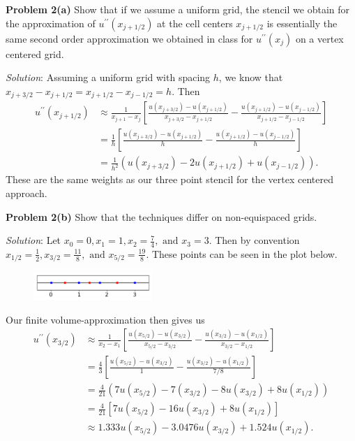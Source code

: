 \documentclass[12pt]{article}
\newcommand{\problem}[1]{\hspace{-4 ex} \large \textbf{Problem #1} }
\newcommand{\solution}{\textit{Solution}:\bigbreak}
\begin{document}
\problem{2(a)} Show that if we assume a uniform grid, the stencil we obtain for the approximation of $u^{\prime\prime}(x_{j+1/2})$ at the cell centers $x_{j+1/2}$ is essentially the same second order approximation we obtained in class for $u^{\prime\prime}(x_j)$ on a vertex centered grid. \bigbreak

\solution
Assuming a uniform grid with spacing $h$, we know that $x_{j+3/2}-x_{j+1/2} = x_{j+1/2}-x_{j-1/2} = h$. Then
\begin{align*}
	u^{\prime\prime}(x_{j+1/2}) &\approx \frac{1}{x_{j+1} - x_j} \left[ \frac{u(x_{j+3/2}) - u(x_{j+1/2})}{x_{j+3/2} - x_{j+1/2}} - \frac{u(x_{j+1/2}) - u(x_{j-1/2})}{x_{j+1/2} - x_{j-1/2}} \right] \\
	 &= \frac{1}{h} \left[ \frac{u(x_{j+3/2}) - u(x_{j+1/2})}{h} - \frac{u(x_{j+1/2}) - u(x_{j-1/2})}{h} \right] \\
	 &= \frac{1}{h^2} \left( u(x_{j+3/2}) - 2u(x_{j+1/2}) + u(x_{j-1/2}) \right) \text{.}
\end{align*}
These are the same weights as our three point stencil for the vertex centered approach.
\bigbreak


\problem{2(b)} Show that the techniques differ on non-equispaced grids. 

\solution
Let $x_0 = 0, x_1 = 1, x_2 = \frac{7}{4}, \text{ and } x_3 = 3$.  Then by convention $x_{1/2} = \frac{1}{2}, x_{3/2} = \frac{11}{8}, \text{ and } x_{5/2} = \frac{19}{8}$. These points can be seen in the plot below.
\begin{figure}[H]
	\includegraphics[width=0.4\textwidth]{unequal_points}
	\centering
\end{figure}

Our finite volume-approximation then gives us
\begin{align*}
	u^{\prime\prime}(x_{3/2}) &\approx \frac{1}{x_{2} - x_1} \left[ \frac{u(x_{5/2}) - u(x_{3/2})}{x_{5/2} - x_{3/2}} - \frac{u(x_{3/2}) - u(x_{1/2})}{x_{3/2} - x_{1/2}} \right] \\
	&= \frac{4}{3} \left[ \frac{u(x_{5/2}) - u(x_{3/2})}{1} - \frac{u(x_{3/2}) - u(x_{1/2})}{7/8} \right] \\
	&= \frac{4}{21} \left( 7u(x_{5/2}) - 7(x_{3/2}) - 8u(x_{3/2}) + 8u(x_{1/2}) \right) \\
	&= \frac{4}{21} \left[ 7u(x_{5/2}) - 16u(x_{3/2}) + 8u(x_{1/2}) \right] \\
	&\approx 1.333u(x_{5/2}) - 3.0476u(x_{3/2}) + 1.524u(x_{1/2}) \text{.}
\end{align*}
\end{document}
